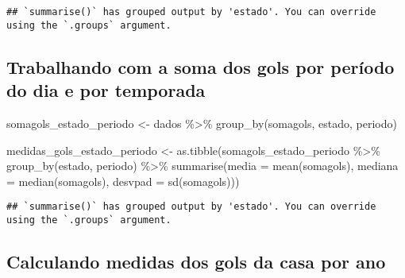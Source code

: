 \documentclass[
]{article}
\newenvironment{Shaded}{\begin{snugshade}}{\end{snugshade}}
\newcommand{\FunctionTok}[1]{\textcolor[rgb]{0.00,0.00,0.00}{#1}}
\newcommand{\NormalTok}[1]{#1}
\newcommand{\OtherTok}[1]{\textcolor[rgb]{0.56,0.35,0.01}{#1}}
\newcommand{\SpecialCharTok}[1]{\textcolor[rgb]{0.00,0.00,0.00}{#1}}
\newcommand{\StringTok}[1]{\textcolor[rgb]{0.31,0.60,0.02}{#1}}
\begin{document}
\begin{verbatim}
## `summarise()` has grouped output by 'estado'. You can override using the `.groups` argument.
\end{verbatim}

\hypertarget{trabalhando-com-a-soma-dos-gols-por-peruxedodo-do-dia-e-por-temporada}{%
\subsection{Trabalhando com a soma dos gols por período do dia e por
temporada}\label{trabalhando-com-a-soma-dos-gols-por-peruxedodo-do-dia-e-por-temporada}}

\begin{Shaded}
\begin{Highlighting}[]
\NormalTok{somagols\_estado\_periodo }\OtherTok{\textless{}{-}}\NormalTok{ dados }\SpecialCharTok{\%\textgreater{}\%} \FunctionTok{group\_by}\NormalTok{(somagols, estado, periodo)}



\NormalTok{medidas\_gols\_estado\_periodo }\OtherTok{\textless{}{-}} \FunctionTok{as.tibble}\NormalTok{(somagols\_estado\_periodo }\SpecialCharTok{\%\textgreater{}\%} \FunctionTok{group\_by}\NormalTok{(estado, periodo) }\SpecialCharTok{\%\textgreater{}\%} 
                                  \FunctionTok{summarise}\NormalTok{(}\StringTok{\textquotesingle{}media\textquotesingle{}} \OtherTok{=} \FunctionTok{mean}\NormalTok{(somagols),}
                                            \StringTok{\textquotesingle{}mediana\textquotesingle{}} \OtherTok{=} \FunctionTok{median}\NormalTok{(somagols),}
                                            \StringTok{\textquotesingle{}desvpad\textquotesingle{}} \OtherTok{=} \FunctionTok{sd}\NormalTok{(somagols)))}
\end{Highlighting}
\end{Shaded}

\begin{verbatim}
## `summarise()` has grouped output by 'estado'. You can override using the `.groups` argument.
\end{verbatim}

\hypertarget{calculando-medidas-dos-gols-da-casa-por-ano}{%
\subsection{Calculando medidas dos gols da casa por
ano}\label{calculando-medidas-dos-gols-da-casa-por-ano}}
\end{document}
